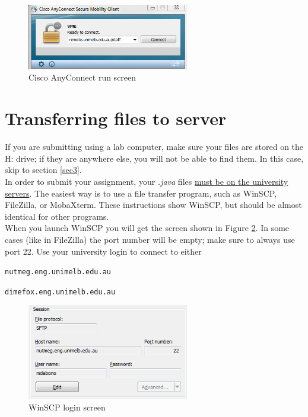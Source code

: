 \documentclass[]{article}
\begin{document}
\begin{figure}[!h]
	\centering
	\includegraphics[width=200pt]{Images/Cisco}
	\caption{Cisco AnyConnect run screen}
	\label{fig:ciscoRun}
\end{figure}

\section{Transferring files to server}
\label{sec2}
If you are submitting using a lab computer, make sure your files are stored on the H: drive; if they are anywhere else, you will not be able to find them. In this case, skip to section \ref{sec3}.\\

In order to submit your assignment, your \textit{.java} files \underline{must be on the university servers}. The easiest way is to use a file transfer program, such as WinSCP, FileZilla, or MobaXterm. These instructions show WinSCP, but should be almost identical for other programs.\\

When you launch WinSCP you will get the screen shown in Figure \ref{fig:WinSCPLogin}. In some cases (like in FileZilla) the port number will be empty; make sure to always use port 22. Use your university login to connect to either
\begin{center}
\verb'nutmeg.eng.unimelb.edu.au'

\verb'dimefox.eng.unimelb.edu.au'
\end{center}

\begin{figure}[!h]
	\centering
	\includegraphics[width=200pt]{Images/WinSCPLogin}
	\caption{WinSCP login screen}
	\label{fig:WinSCPLogin}
\end{figure}
\end{document}

